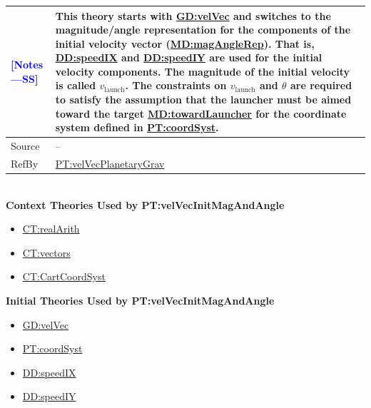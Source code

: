 \documentclass[12pt]{article}
\newcommand{\authornote}[3]{\textcolor{#1}{[#3 ---#2]}}
\newcommand{\authornote}[3]{}
\newcommand{\wss}[1]{\authornote{blue}{SS}{#1}}
\begin{document}
\begin{minipage}{\textwidth}
\begin{tabular}{>{\raggedright}p{}>{\raggedright\arraybackslash}p{}}
\\ \midrule \wss{Notes} & This theory starts with
\hyperref[GD:velVec]{GD:velVec} and switches to the magnitude/angle
representation for the components of the initial velocity vector
(\hyperref[MD:magAngleRep]{MD:magAngleRep}).  That is,
\hyperref[DD:speedIX]{DD:speedIX} and \hyperref[DD:speedIY]{DD:speedIY} are used
for the initial velocity components. The magnitude of the initial velocity is
called $v_\text{launch}$.  The constraints on $v_\text{launch}$ and $\theta$ are
required to satisfy the assumption that the launcher must be aimed toward the
target \hyperref[MD:towardLauncher]{MD:towardLauncher} for the coordinate system
defined in \hyperref[PT:coordSyst]{PT:coordSyst}.

\\ \midrule
Source & --
         
\\ \midrule
RefBy & \hyperref[PT:velVecPlanetaryGrav]{PT:velVecPlanetaryGrav}

\\ \bottomrule
\end{tabular}
\end{minipage}
~\\

\noindent \textbf{Context Theories Used by PT:velVecInitMagAndAngle}

\begin{itemize}
\item \hyperref[CT:realArith]{CT:realArith}
\item \hyperref[CT:vectors]{CT:vectors}
\item \hyperref[CT:CartCoordSyst]{CT:CartCoordSyst}
\end{itemize}

\noindent \textbf{Initial Theories Used by PT:velVecInitMagAndAngle}

\begin{itemize}
\item \hyperref[GD:velVec]{GD:velVec}
\item \hyperref[PT:coordSyst]{PT:coordSyst}
\item \hyperref[DD:speedIX]{DD:speedIX}
\item \hyperref[DD:speedIY]{DD:speedIY}
\end{itemize}
\end{document}
